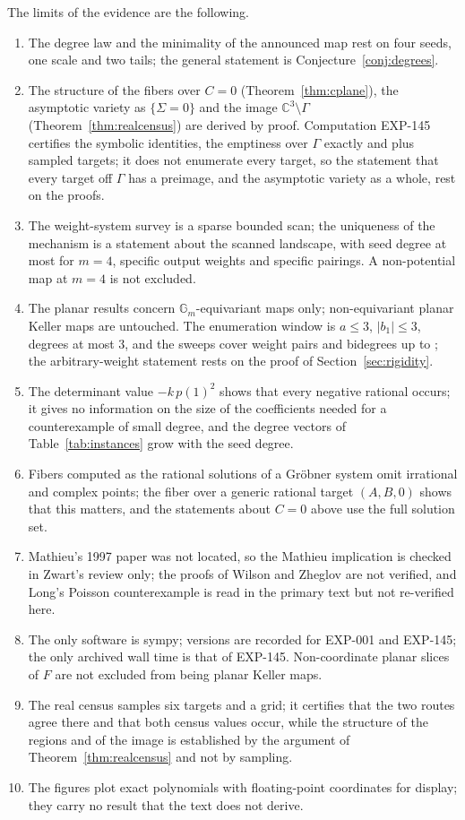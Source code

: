 \documentclass[11pt]{article}
\theoremstyle{definition}
\theoremstyle{remark}
\newcommand{\C}{\mathbb{C}}
\newcommand{\Gm}{\mathbb{G}_m}
\begin{document}
The limits of the evidence are the following.
\begin{enumerate}
\item The degree law and the minimality of the announced map rest on four seeds, one scale and two tails; the general statement is Conjecture~\ref{conj:degrees}.
\item The structure of the fibers over $C = 0$ (Theorem~\ref{thm:cplane}), the asymptotic variety as $\{\Sigma = 0\}$ and the image $\C^3 \setminus \Gamma$ (Theorem~\ref{thm:realcensus}) are derived by proof. Computation EXP-145 certifies the symbolic identities, the emptiness over $\Gamma$ exactly and \numImgTargets{} plus \numPlaneTargets{} sampled targets; it does not enumerate every target, so the statement that every target off $\Gamma$ has a preimage, and the asymptotic variety as a whole, rest on the proofs.
\item The weight-system survey is a sparse bounded scan; the uniqueness of the mechanism is a statement about the scanned landscape, with seed degree at most \numSeedDegMax{} for $m = 4$, specific output weights and specific pairings. A non-potential map at $m = 4$ is not excluded.
\item The planar results concern $\Gm$-equivariant maps only; non-equivariant planar Keller maps are untouched. The enumeration window is $a \le 3$, $|b_1| \le 3$, degrees at most $3$, and the sweeps cover \numWeightPairs{} weight pairs and bidegrees up to \numSweepDeg{}; the arbitrary-weight statement rests on the proof of Section~\ref{sec:rigidity}.
\item The determinant value $-k\,p(1)^2$ shows that every negative rational occurs; it gives no information on the size of the coefficients needed for a counterexample of small degree, and the degree vectors of Table~\ref{tab:instances} grow with the seed degree.
\item Fibers computed as the rational solutions of a Gr\"obner system omit irrational and complex points; the fiber over a generic rational target $(A,B,0)$ shows that this matters, and the statements about $C = 0$ above use the full solution set.
\item Mathieu's 1997 paper was not located, so the Mathieu implication is checked in Zwart's review only; the proofs of Wilson and Zheglov are not verified, and Long's Poisson counterexample is read in the primary text but not re-verified here.
\item The only software is sympy; versions are recorded for EXP-001 and EXP-145; the only archived wall time is that of EXP-145. Non-coordinate planar slices of $F$ are not excluded from being planar Keller maps.
\item The real census samples six targets and a grid; it certifies that the two routes agree there and that both census values occur, while the structure of the regions and of the image is established by the argument of Theorem~\ref{thm:realcensus} and not by sampling.
\item The figures plot exact polynomials with floating-point coordinates for display; they carry no result that the text does not derive.
\end{enumerate}
\end{document}
